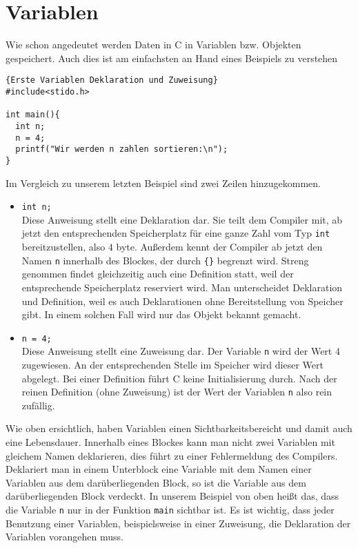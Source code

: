 \section{Variablen}

Wie schon angedeutet werden Daten in C in Variablen bzw. Objekten gespeichert.
Auch dies ist am einfachsten an Hand eines Beispiels zu verstehen
\begin{lstlisting}{Erste Variablen Deklaration und Zuweisung}
#include<stido.h>

int main(){
  int n;
  n = 4;
  printf("Wir werden n zahlen sortieren:\n");
}
\end{lstlisting}
Im Vergleich zu unserem letzten Beispiel sind zwei Zeilen hinzugekommen. 
\begin{itemize}
\item \texttt{int n;}\\
  Diese Anweisung stellt eine Deklaration dar. 
  Sie teilt dem Compiler mit, ab jetzt den entsprechenden Speicherplatz für eine ganze Zahl vom Typ \texttt{int} bereitzustellen, also $4$ byte.
  Außerdem kennt der Compiler ab jetzt den Namen \texttt{n} innerhalb des Blockes, der durch \texttt{\{\}} begrenzt wird.
  Streng genommen findet gleichzeitig auch eine Definition statt, weil der entsprechende Speicherplatz reserviert wird. 
  Man unterscheidet Deklaration und Definition, weil es auch Deklarationen ohne Bereitstellung von Speicher gibt.
  In einem solchen Fall wird nur das Objekt bekannt gemacht.

\item \verb|n = 4;|\\
  Diese Anweisung stellt eine Zuweisung dar.
  Der Variable \texttt{n} wird der Wert $4$ zugewiesen.
  An der entsprechenden Stelle im Speicher wird dieser Wert abgelegt.
  Bei einer Definition führt C keine Initialisierung durch.
  Nach der reinen Definition (ohne Zuweisung) ist der Wert der Variablen \texttt{n} also rein zufällig.
\end{itemize}
Wie oben ersichtlich, haben Variablen einen Sichtbarkeitsbereicht und damit auch eine Lebensdauer.
Innerhalb eines Blockes kann man nicht zwei Variablen mit gleichem Namen deklarieren, dies führt zu einer Fehlermeldung des Compilers.
Deklariert man in einem Unterblock eine Variable mit dem Namen einer Variablen aus dem darüberliegenden Block, so ist die Variable aus dem darüberliegenden Block verdeckt.
In unserem Beispiel von oben heißt das, dass die Variable \texttt{n} nur in der Funktion \texttt{main} sichtbar ist. 
Es ist wichtig, dass jeder Benutzung einer Variablen, beispielsweise in einer Zuweisung, die Deklaration der Variablen vorangehen muss.
